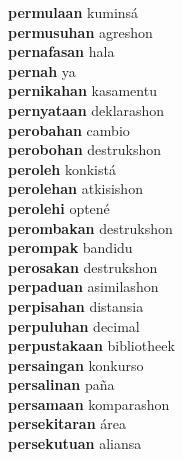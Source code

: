 \textbf{permulaan } kuminsá \\
\textbf{permusuhan } agreshon \\
\textbf{pernafasan } hala \\
\textbf{pernah } ya \\
\textbf{pernikahan } kasamentu \\
\textbf{pernyataan } deklarashon \\
\textbf{perobahan } cambio \\
\textbf{perobohan } destrukshon \\
\textbf{peroleh } konkistá \\
\textbf{perolehan } atkisishon \\
\textbf{perolehi } optené \\
\textbf{perombakan } destrukshon \\
\textbf{perompak } bandidu \\
\textbf{perosakan } destrukshon \\
\textbf{perpaduan } asimilashon \\
\textbf{perpisahan } distansia \\
\textbf{perpuluhan } decimal \\
\textbf{perpustakaan } bibliotheek \\
\textbf{persaingan } konkurso \\
\textbf{persalinan } paña \\
\textbf{persamaan } komparashon \\
\textbf{persekitaran } área \\
\textbf{persekutuan } aliansa \\

